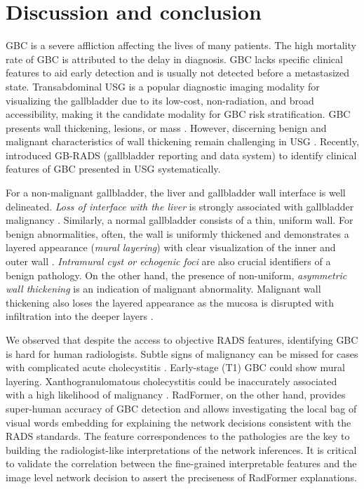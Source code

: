 \documentclass[twocolumn,final]{elsarticle}
\def\myarch{RadFormer\xspace}
\begin{document}
\section{Discussion and conclusion}
GBC is a severe affliction affecting the lives of many patients. The high mortality rate of GBC is attributed to the delay in diagnosis. GBC lacks specific clinical features to aid early detection and is usually not detected before a metastasized state. Transabdominal USG is a popular diagnostic imaging modality for visualizing the gallbladder due to its low-cost, non-radiation, and broad accessibility, making it the candidate modality for GBC risk stratification. GBC presents wall thickening, lesions, or mass \citep{lopes2021gallbladder}. However, discerning benign and malignant characteristics of wall thickening remain challenging in USG \citep{gupta2020evaluation}. Recently, \cite{gb-rads-paper} introduced GB-RADS (gallbladder reporting and data system) to identify clinical features of GBC presented in USG systematically. 
%
\par For a non-malignant gallbladder, the liver and gallbladder wall interface is well delineated. \emph{Loss of interface with the liver} is strongly associated with gallbladder malignancy \citep{catalano2008mr}. Similarly, a normal gallbladder consists of a thin, uniform wall. For benign abnormalities, often, the wall is uniformly thickened and demonstrates a layered appearance (\emph{mural layering}) with clear visualization of the inner and outer wall \citep{mizuguchi1997endoscopic}. \emph{Intramural cyst or echogenic foci} are also crucial identifiers of a benign pathology.
On the other hand, the presence of non-uniform, \emph{asymmetric wall thickening} is an indication of malignant abnormality. Malignant wall thickening also loses the layered appearance as the mucosa is disrupted with infiltration into the deeper layers \citep{joo2013differentiation}. 
%
\par We observed that despite the access to objective RADS features, identifying GBC is hard for human radiologists. Subtle signs of malignancy can be missed for cases with complicated acute cholecystitis \citep{liu2012contrast}. Early-stage (T1) GBC could show mural layering. Xanthogranulomatous cholecystitis could be inaccurately associated with a high likelihood of malignancy \citep{deng2015xanthogranulomatous, zhang2019usefulness}. \myarch, on the other hand, provides super-human accuracy of GBC detection and allows investigating the local bag of visual words embedding for explaining the network decisions consistent with the RADS standards. The feature correspondences to the pathologies are the key to building the radiologist-like interpretations of the network inferences. It is critical to validate the correlation between the fine-grained interpretable features and the image level network decision to assert the preciseness of \myarch explanations.
\end{document}
